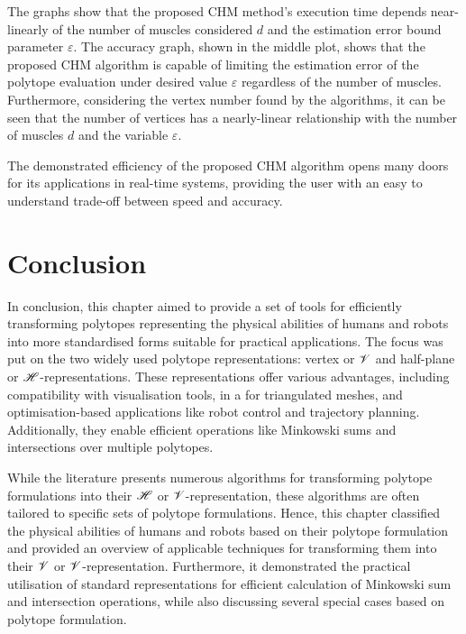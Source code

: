 The graphs show that the proposed CHM method's execution time depends near-linearly of the number of muscles considered $d$ and the estimation error bound parameter $\varepsilon$. The accuracy graph, shown in the middle plot, shows that the proposed CHM algorithm is capable of limiting the estimation error of the polytope evaluation under desired value $\varepsilon$ regardless of the number of muscles. Furthermore, considering the vertex number found by the algorithms, it can be seen that the number of vertices has a nearly-linear relationship with the number of muscles $d$ and the variable $\varepsilon$. 

The demonstrated efficiency of the proposed CHM algorithm opens many doors for its applications in real-time systems, providing the user with an easy to understand trade-off between speed and accuracy.



\section{Conclusion}

In conclusion, this chapter aimed to provide a set of tools for efficiently transforming polytopes representing the physical abilities of humans and robots into more standardised forms suitable for practical applications. The focus was put on the two widely used polytope representations: vertex or $\mathscr{V}$ and half-plane or $\mathscr{H}$-representations. These representations offer various advantages, including compatibility with visualisation tools, in a for triangulated meshes, and optimisation-based applications like robot control and trajectory planning. Additionally, they enable efficient operations like Minkowski sums and intersections over multiple polytopes.

While the literature presents numerous algorithms for transforming polytope formulations into their $\mathscr{H}$ or $\mathscr{V}$-representation, these algorithms are often tailored to specific sets of polytope formulations. Hence, this chapter classified the physical abilities of humans and robots based on their polytope formulation and provided an overview of applicable techniques for transforming them into their $\mathscr{V}$ or $\mathscr{V}$-representation. Furthermore, it demonstrated the practical utilisation of standard representations for efficient calculation of Minkowski sum and intersection operations, while also discussing several special cases based on polytope formulation.

